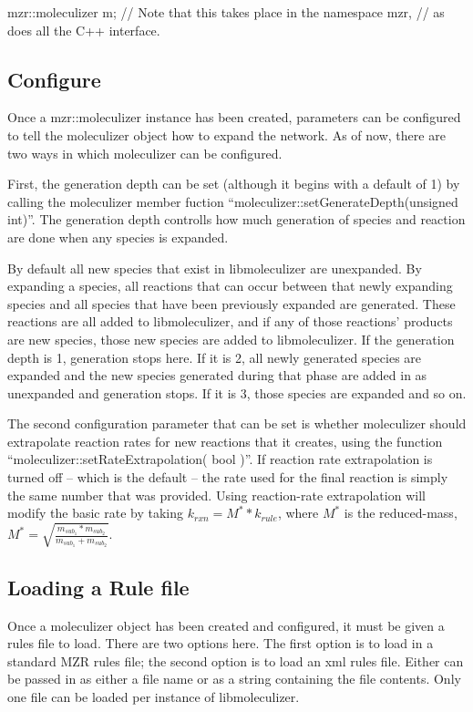 \begin{ExampleCPP}[caption=Creating a moleculizer object, label=creatingmzrexample]
mzr::moleculizer m; // Note that this takes place in the namespace mzr,
                    // as does all the C++ interface.
\end{ExampleCPP}


\subsection{Configure}
Once a mzr::moleculizer instance has been created, parameters can be
configured to tell the moleculizer object how to expand the network.
As of now, there are two ways in which moleculizer can be configured.  

First, the generation depth can be set (although it begins with a
default of 1) by calling the moleculizer member fuction
``moleculizer::setGenerateDepth(unsigned int)''.  The generation depth
controlls how much generation of species and reaction are done when
any species is expanded.  

By default all new species that exist in libmoleculizer are
unexpanded.  By expanding a species, all reactions that can occur
between that newly expanding species and all species that have been
previously expanded are generated.  These reactions are all added to
libmoleculizer, and if any of those reactions' products are new
species, those new species are added to libmoleculizer.  If the
generation depth is 1, generation stops here.  If it is 2, all newly
generated species are expanded and the new species generated during
that phase are added in as unexpanded and generation stops.  If it is
3, those species are expanded and so on.  

The second configuration parameter that can be set is whether
moleculizer should extrapolate reaction rates for new reactions that
it creates, using the function ``moleculizer::setRateExtrapolation(
bool )''.  If reaction rate extrapolation is turned off -- which is the default
-- the rate used for the final reaction is simply the same number that
was provided.  Using reaction-rate extrapolation will modify the basic
rate by taking $k_{rxn} = M^*
* k_{rule}$, where $M^*$ is the reduced-mass,
$M^*=\sqrt{\frac{m_{sub_1} * m_{sub_2}}{m_{sub_1} + m_{sub_2}} }$.

\subsection{Loading a Rule file}
Once a moleculizer object has been created and configured, it must be
given a rules file to load.  There are two options here.  The first
option is to load in a standard MZR rules file; the second option is
to load an xml rules file.  Either can be passed in as either a file
name or as a string containing the file contents.  Only one file can
be loaded per instance of libmoleculizer.

